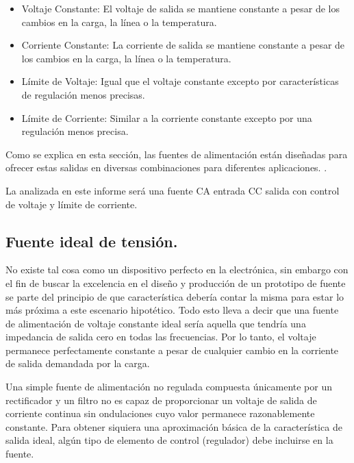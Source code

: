 \begin{itemize}
    \item Voltaje Constante: El voltaje de salida se mantiene constante a pesar de los cambios en la carga, la línea o la temperatura.
    \item Corriente Constante: La corriente de salida se mantiene constante a pesar de los cambios en la carga, la línea o la temperatura.
    \item Límite de Voltaje: Igual que el voltaje constante excepto por características de regulación menos precisas.
    \item Límite de Corriente: Similar a la corriente constante excepto por una regulación menos precisa.
\end{itemize} \par 
Como se explica en esta sección, las fuentes de alimentación están diseñadas para ofrecer estas salidas en diversas combinaciones para diferentes aplicaciones. \cite{agilent2000}. \par 
La analizada en este informe será una fuente CA entrada CC salida con control de voltaje y límite de corriente.

\subsection{Fuente ideal de  tensión.} \par 
No existe tal cosa como un dispositivo perfecto en la electrónica, sin embargo con el fin de buscar la excelencia en el diseño y producción de un prototipo de fuente se parte del principio de que característica debería contar la misma para estar lo más próxima a este escenario hipotético. Todo esto lleva a decir que una fuente de alimentación de voltaje constante ideal sería aquella que tendría una impedancia de salida cero en todas las frecuencias. Por lo tanto, el voltaje permanece perfectamente constante a pesar de cualquier cambio en la corriente de salida demandada por la carga. \par 
Una simple fuente de alimentación no regulada compuesta únicamente por un rectificador y un filtro no es capaz de proporcionar un voltaje de salida de corriente continua sin ondulaciones cuyo valor permanece razonablemente constante. Para obtener siquiera una aproximación básica de la característica de salida ideal, algún tipo de elemento de control (regulador) debe incluirse en la fuente. \cite{agilent2000} 

